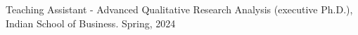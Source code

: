 %
%
%


\begin{awards}
    \award
    {Teaching Assistant - Advanced Qualitative Research Analysis (executive Ph.D.), Indian School of Business.} {Spring, 2024}
\end{awards}
